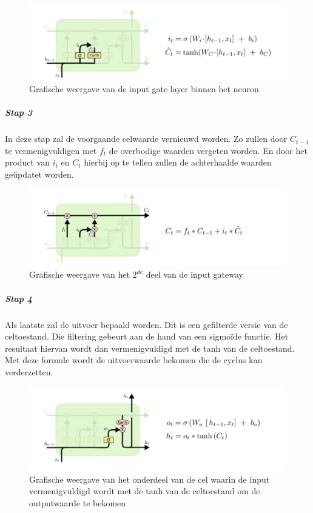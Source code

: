 \begin{figure}
    \centering
    \caption{Grafische weergave van de input gate layer binnen het neuron~\autocite{Olah2015}}
    \label{fig:lstmfig4}
    \includegraphics[width=0.7\linewidth]{lstmFig4}
\end{figure}

\subparagraph{Stap 3}
In deze stap zal de voorgaande celwaarde vernieuwd worden. Zo zullen door $C_{t-1}$ te vermenigvuldigen met $f_t$ de overbodige waarden vergeten worden. En door het product van $i_t$ en $C_t$ hierbij op te tellen zullen de achterhaalde waarden ge\"{u}pdatet worden. 

\begin{figure}
    \centering
    \caption{Grafische weergave van het $2^{de}$ deel van de input gateway~\autocite{Olah2015}}
    \label{fig:lstmfig5}
    \includegraphics[width=0.7\linewidth]{lstmFig5}
\end{figure}

\subparagraph{Stap 4}
Als laatste zal de uitvoer bepaald worden. Dit is een gefilterde versie van de celtoestand. Die filtering gebeurt aan de hand van een sigmo\"{i}de functie. Het resultaat hiervan wordt dan vermenigvuldigd met de tanh van de celtoestand. Met deze formule wordt de uitvoerwaarde bekomen die de cyclus kan verderzetten.  

\begin{figure}
    \centering
    \caption{Grafische weergave van het onderdeel van de cel waarin de input vermenigvuldigd wordt met de tanh van de celtoestand om de outputwaarde te bekomen~\autocite{Olah2015}}
    \label{fig:lstmfig6}
    \includegraphics[width=0.7\linewidth]{lstmFig6}
\end{figure}

